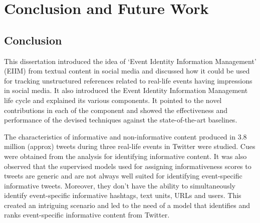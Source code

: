 
\chapter{Conclusion and Future Work} %

\label{Conclusion} %

\doublespacing
\setlength{\parindent}{1cm}
\section{Conclusion}
This dissertation introduced the idea of `Event Identity Information Management' (EIIM) from textual content in social media and discussed how it could be used for tracking unstructured references related to real-life events having impressions in social media. It also introduced the Event Identity Information Management life cycle and explained its various components. It pointed to the novel contributions in each of the component and showed the effectiveness and performance of the devised techniques against the state-of-the-art baselines. 

The characteristics of informative and non-informative content produced in 3.8 million (approx) tweets during three real-life events in Twitter were studied. Cues were obtained from the analysis for identifying informative content. It was also observed that the supervised models used for assigning informativeness scores to tweets are generic and are not always well suited for identifying event-specific informative tweets. Moreover, they don't have the ability to simultaneously identify event-specific informative hashtags, text units, URLs and users. This created an intriguing scenario and led to the need of a model that identifies and ranks event-specific informative content from Twitter.

